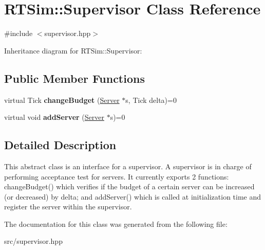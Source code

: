 \hypertarget{classRTSim_1_1Supervisor}{}\section{R\+T\+Sim\+:\+:Supervisor Class Reference}
\label{classRTSim_1_1Supervisor}


{\ttfamily \#include $<$supervisor.\+hpp$>$}



Inheritance diagram for R\+T\+Sim\+:\+:Supervisor\+:
\subsection*{Public Member Functions}
\begin{DoxyCompactItemize}
\item 
virtual Tick {\bfseries change\+Budget} (\hyperlink{classRTSim_1_1Server}{Server} $\ast$s, Tick delta)=0\hypertarget{classRTSim_1_1Supervisor_a36f2f3e727e180be0219ad6e305d8fe5}{}\label{classRTSim_1_1Supervisor_a36f2f3e727e180be0219ad6e305d8fe5}

\item 
virtual void {\bfseries add\+Server} (\hyperlink{classRTSim_1_1Server}{Server} $\ast$s)=0\hypertarget{classRTSim_1_1Supervisor_a946a37813718b02dd1caf7cf8a094b38}{}\label{classRTSim_1_1Supervisor_a946a37813718b02dd1caf7cf8a094b38}

\end{DoxyCompactItemize}


\subsection{Detailed Description}
This abstract class is an interface for a supervisor. A supervisor is in charge of performing acceptance test for servers. It currently exports 2 functions\+: change\+Budget() which verifies if the budget of a certain server can be increased (or decreased) by delta; and add\+Server() which is called at initialization time and register the server within the supervisor. 

The documentation for this class was generated from the following file\+:\begin{DoxyCompactItemize}
\item 
src/supervisor.\+hpp\end{DoxyCompactItemize}
